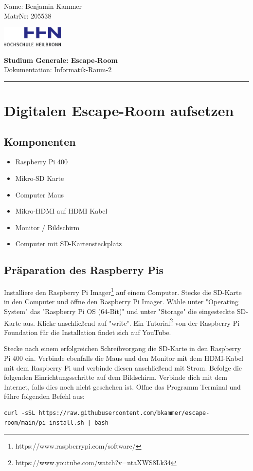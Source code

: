 \documentclass[12pt, letterpaper]{article}
\renewcommand\maketitle{
    \begin{flushleft}
        Name: Benjamin Kammer \\
        MatrNr: 205538
    \end{flushleft}

    \begin{flushright}\vspace{-15mm}
        \includegraphics[width=3.1cm]{logo.png}
    \end{flushright}

    \begin{center}
        \textbf{\large Studium Generale: Escape-Room}\\
        Dokumentation: Informatik-Raum-2
    \end{center}

    \rule{\linewidth}{0.1mm}

    \bigskip
}
\begin{document}
\maketitle

\section{Digitalen Escape-Room aufsetzen}
\subsection{Komponenten}

\begin{itemize}
	\item Raspberry Pi 400
    \item Mikro-SD Karte
	\item Computer Maus
	\item Mikro-HDMI auf HDMI Kabel
	\item Monitor / Bildschirm
    \item Computer mit SD-Kartensteckplatz
\end{itemize}

\subsection{Präparation des Raspberry Pis}

Installiere den Raspberry Pi Imager\footnote{https://www.raspberrypi.com/software/} auf einem Computer.
Stecke die SD-Karte in den Computer und öffne den Raspberry Pi Imager.
Wähle unter "Operating System" das "Raspberry Pi OS (64-Bit)" und unter "Storage" die eingesteckte SD-Karte aus.
Klicke anschließend auf "write".
Ein Tutorial\footnote{https://www.youtube.com/watch?v=ntaXWS8Lk34} von der Raspberry Pi Foundation für die Installation findet sich auf YouTube.

Stecke nach einem erfolgreichen Schreibvorgang die SD-Karte in den Raspberry Pi 400 ein.
Verbinde ebenfalls die Maus und den Monitor mit dem HDMI-Kabel mit dem Raspberry Pi und verbinde diesen anschließend mit Strom.
Befolge die folgenden Einrichtungsschritte auf dem Bildschirm.
Verbinde dich mit dem Internet, falls dies noch nicht geschehen ist.
Öffne das Programm Terminal und führe folgenden Befehl aus:

\begin{verbatim}
curl -sSL https://raw.githubusercontent.com/bkammer/escape-room/main/pi-install.sh | bash
\end{verbatim}
\end{document}
